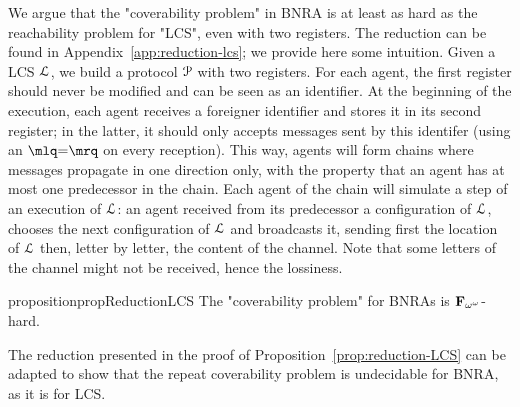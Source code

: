 We argue that the "coverability problem" in BNRA is at least as hard as the reachability problem for "LCS", even with two registers. The reduction can be found in Appendix~\ref{app:reduction-lcs}; we provide here some intuition. Given a LCS $\mathcal{L}$, we build a protocol $\mathcal{P}$ with two registers. For each agent, the first register should never be modified and can be seen as an identifier. At the beginning of the execution, each agent receives a foreigner identifier and stores it in its second register; in the latter, it should only accepts messages sent by this identifer (using an $\quotemarks{\eqtestact}$ on every reception). This way, agents will form chains where messages propagate in one direction only, with the property that an agent has at most one predecessor in the chain. Each agent of the chain will simulate a step of an execution of $\mathcal{L}$: an agent received from its predecessor a configuration of $\mathcal{L}$, chooses the next configuration of $\mathcal{L}$ and broadcasts it, sending first the location of $\mathcal{L}$ then, letter by letter, the content of the channel. Note that some letters of the channel might not be received, hence the lossiness. 

\begin{restatable}{proposition}{propReductionLCS}
	\label{prop:reduction-LCS}
	The "coverability problem" for BNRAs is $\mathbf{F}_{\omega^\omega}$-hard.
\end{restatable}


\begin{remark}
	The reduction presented in the proof of Proposition~\ref{prop:reduction-LCS} can be adapted to show that the repeat coverability problem is undecidable for BNRA, as it is for LCS.
\end{remark}

